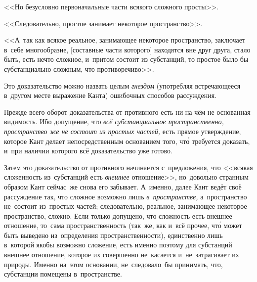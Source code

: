 <<Но безусловно первоначальные части всякого сложного просты>>.

<<Следовательно, простое занимает некоторое пространство>>.

<<А~так как всякое реальное, занимающее некоторое пространство, заключает
в~себе многообразие, [составные части которого] находятся вне друг друга,
стало быть, есть нечто сложное, и~притом состоит из субстанций, то простое
было бы субстанциально сложным, что противоречиво>>.

Это доказательство можно назвать целым {\em гнездом} (употребляя встречающееся
в~другом месте выражение Канта) ошибочных способов рассуждения.

Прежде всего оборот доказательства от противного есть ни на чём не основанная
видимость. Ибо допущение, что {\em всё субстанциальное пространственно,
пространство же не состоит из простых частей,} есть прямое утверждение,
которое Кант делает непосредственным основанием того, чт\'{о} требуется
доказать, и~при наличии которого всё доказательство уже готово.

\begin{midsloppypar}
Затем это доказательство от противного начинается с~предложения, что <<всякая
сложенность из~субстанций есть {\em внешнее} отношение>>, но~довольно странным
образом Кант сейчас~же снова его забывает. А~именно, далее Кант ведёт своё
рассуждение так, что сложное возможно лишь {\em в~пространстве,} а~пространство
не~состоит из~простых частей; следовательно, реальное, занимающее некоторое
пространство, сложно. Если только допущено, что сложность есть внешнее
отношение, то~сама пространственность (так~же, как и~всё прочее, чт\'{о} может
быть выведено из~определения пространственности), единственно лишь в~которой
якобы возможно сложение, есть именно поэтому для субстанций внешнее отношение,
которое их совершенно не~касается и~не~затрагивает их природы. Именно на~этом
основании, не~следовало~бы принимать, что, субстанции помещены в~пространстве.
\end{midsloppypar}

